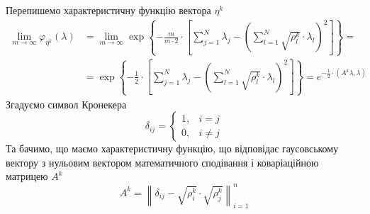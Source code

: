 Перепишемо характеристичну функцію вектора $\eta^k$
\begin{equation*}
  \begin{split}
    \lim_{m \to \infty} \varphi_{\eta^k}\left( \lambda \right)
    &= \lim_{m \to \infty} \exp{\left\{ -\frac{m}{m \cdot 2}
      \cdot \left[ \sum_{j=1}^{N} \lambda_j
        - \left( \sum_{l=1}^{N} \sqrt{\rho_l^k} \cdot \lambda_l \right)^2
        \right]\right\}} = \\
    &= \exp{\left\{ -\frac{1}{2} \cdot
      \left[ \sum_{j=1}^{N} \lambda_j
        - \left( \sum_{l=1}^{N} \sqrt{\rho_l^k} \cdot \lambda_l \right)^2
        \right] \right\}}
    = e^{-\frac{1}{2} \cdot \left( A^k \lambda, \lambda \right)}
  \end{split}
\end{equation*}
Згадуємо символ Кронекера
\begin{equation*}
  \delta_{ij} = \begin{cases}
    1, &i = j \\
    0, &i \neq j
    \end{cases}
\end{equation*}
Та бачимо, що маємо характеристичну функцію, що відповідає гаусовському вектору
з нульовим вектором математичного сподівання і коваріаційною матрицею $A^k$
\begin{equation*}
  A^k
  = \left\| \delta_{ij} - \sqrt{\rho_i^k} \cdot \sqrt{\rho_j^k} \right\|_{i=1}^n
\end{equation*}
